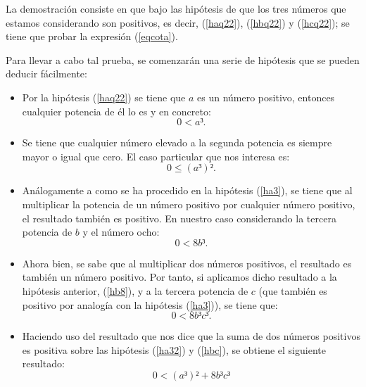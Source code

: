 \begin{demostracion}
  La demostración consiste en que bajo las hipótesis de que los
  tres números que estamos considerando son positivos, es decir,
  (\ref{haq22}), (\ref{hbq22}) y (\ref{hcq22}); se tiene que probar
  la expresión (\ref{eqcota}).

  Para llevar a cabo tal prueba, se comenzarán una serie de hipótesis
  que se pueden deducir fácilmente:
  \begin{itemize}
  \item Por la hipótesis (\ref{haq22}) se tiene que \(a\) es un
    número positivo, entonces cualquier potencia de él lo es y en
    concreto:
    \begin{equation}\label{ha3}\tag{ha3}
      0<a³.
    \end{equation}

  \item Se tiene que cualquier número elevado a la segunda potencia
    es siempre mayor o igual que cero. El caso particular que nos
    interesa es:
    \begin{equation}\label{ha32}\tag{ha32}
      0≤(a³)².
    \end{equation}

  \item Análogamente a como se ha procedido en la hipótesis (\ref{ha3}),
    se tiene que al multiplicar la potencia de un número positivo por
    cualquier número positivo, el resultado también es positivo. En nuestro
    caso considerando la tercera potencia de \(b\) y el número ocho:
    \begin{equation}\label{hb8}\tag{hb8}
      0<8b³.
    \end{equation}

  \item Ahora bien, se sabe que al multiplicar dos números positivos, el
    resultado es también un número positivo. Por tanto, si aplicamos dicho
    resultado a la hipótesis anterior, (\ref{hb8}), y a la tercera potencia
    de \(c\) (que también es positivo por analogía con la hipótesis
    (\ref{ha3})), se tiene que:
    \begin{equation}\label{hbc}\tag{hbc}
      0<8b³c³.
    \end{equation}

  \item Haciendo uso del resultado que nos dice que la suma de dos
    números positivos es positiva sobre las hipótesis (\ref{ha32}) y
    (\ref{hbc}), se obtiene el siguiente resultado:
    \begin{equation}\label{hdenom1}\tag{hdenom1}
       0<(a³)²+8b³c³
     \end{equation}


\end{itemize}
\end{demostracion}
